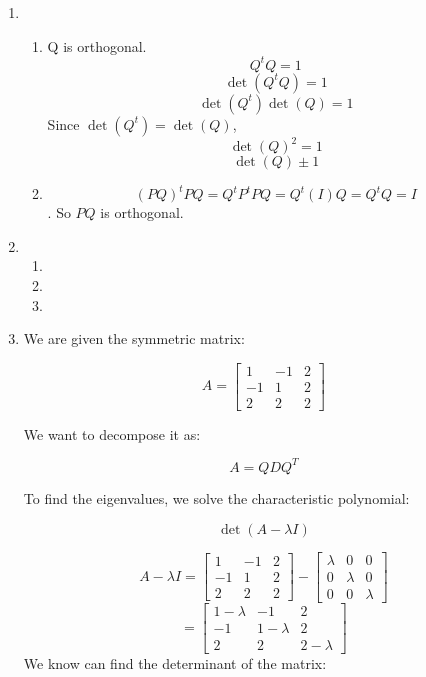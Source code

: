 \documentclass[12pt]{article}
\begin{document}
\begin{enumerate}[leftmargin=0em]
    \item
    \begin{enumerate}[leftmargin=!]
        \item Q is orthogonal.
        \[ Q^{t}Q=1\]
        \[\det(Q^tQ) = 1\]
        \[\det(Q^t)\det(Q)=1\]
        Since $\det(Q^t) = \det(Q)$,
        \[\det(Q)^2 = 1\]
        \[\det(Q)\pm 1\]
        \item
        \[(PQ)^tPQ = Q^tP^tPQ = Q^t(I)Q = Q^tQ=I\].
        So $PQ$ is orthogonal.
    \end{enumerate}

    \item
    \begin{enumerate}[leftmargin=!]
        \item 
        \item 
        \item 
    \end{enumerate}

    \item We are given the symmetric matrix:

    \[
    A = \begin{bmatrix}
    1 & -1 & 2 \\
    -1 & 1 & 2 \\
    2 & 2 & 2
    \end{bmatrix}
    \]
    
    We want to decompose it as:
    
    \[
    A = Q D Q^T
    \]
    
    To find the eigenvalues, we solve the characteristic polynomial:
    
    \[\det(A - \lambda I) \]
    
    \[ A - \lambda I = \begin{bmatrix}
    1 & -1 & 2 \\
    -1 & 1 & 2 \\
    2 & 2 & 2
    \end{bmatrix}
    -
    \begin{bmatrix}
        \lambda & 0 & 0 \\
        0 & \lambda & 0 \\
        0 & 0 & \lambda
    \end{bmatrix}
    \]
    \[
    = \begin{bmatrix}
        1 - \lambda & -1 & 2 \\
        -1 & 1-\lambda & 2 \\
        2 & 2 & 2-\lambda
    \end{bmatrix}
    \]
    We know can find the determinant of the matrix:
    

\end{enumerate}
\end{document}
